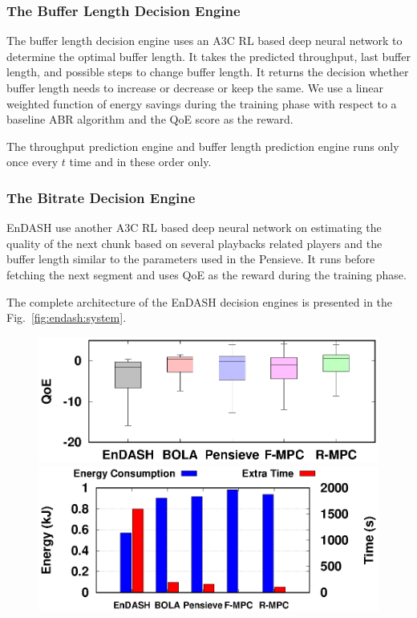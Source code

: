 \subsubsection{The Buffer Length Decision Engine}
The buffer length decision engine uses an A3C RL based deep neural network to determine the optimal buffer length. It takes the predicted throughput, last buffer length, and possible steps to change buffer length. It returns the decision whether buffer length needs to increase or decrease or keep the same. We use a linear weighted function of energy savings during the training phase with respect to a baseline ABR algorithm and the QoE score as the reward.

The throughput prediction engine and buffer length prediction engine runs only once every $t$ time and in these order only.

\subsubsection{The Bitrate Decision Engine}
EnDASH use another A3C RL based deep neural network on estimating the quality of the next chunk based on several playbacks related players and the buffer length similar to the parameters used in the Pensieve\cite{mao2017neural}. It runs before fetching the next segment and uses QoE as the reward during the training phase.

The complete architecture of the EnDASH decision engines is presented in the Fig.~\ref{fig:endash:system}.

\begin{figure}[!h]
	\begin{minipage}[t]{0.48\linewidth}
		\includegraphics[width=\linewidth]{img/EnDASH/QoE}
		\caption{\label{fig:endash:qoe}}
	\end{minipage}\hfill
	\begin{minipage}[t]{0.48\linewidth}
		\includegraphics[width=\linewidth]{img/EnDASH/EnergyConsumption}
		\caption{\label{fig:endash:energy}}
	\end{minipage}
\end{figure}
